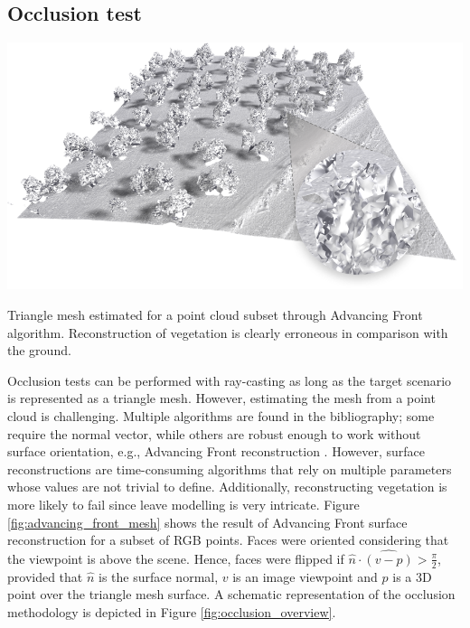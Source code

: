 \newpage
\subsection{Occlusion test}

\begin{marginfigure}[.0cm]
	\centering
	\includegraphics{figs/thermal_projection/triangle_mesh_reconstruction_zoom.png}
	\caption{Triangle mesh estimated for a point cloud subset through Advancing Front algorithm. Reconstruction of vegetation is clearly erroneous in comparison with the ground.}
	\label{fig:advancing_front_mesh}
\end{marginfigure}
Occlusion tests can be performed with ray-casting as long as the target scenario is represented as a triangle mesh. However, estimating the mesh from a point cloud is challenging. Multiple algorithms are found in the bibliography; some require the normal vector, while others are robust enough to work without surface orientation, e.g., Advancing Front reconstruction \cite{cohen-steiner_greedy_2004}. However, surface reconstructions are time-consuming algorithms that rely on multiple parameters whose values are not trivial to define. Additionally, reconstructing vegetation is more likely to fail since leave modelling is very intricate. Figure \ref{fig:advancing_front_mesh} shows the result of Advancing Front surface reconstruction for a subset of RGB points. Faces were oriented considering that the viewpoint is above the scene. Hence, faces were flipped if $\hat{n} \cdot \widehat{(v - p)} > \frac{\pi}{2}$, provided that $\hat{n}$ is the surface normal, $v$ is an image viewpoint and $p$ is a 3D point over the triangle mesh surface. A schematic representation of the occlusion methodology is depicted in Figure \ref{fig:occlusion_overview}.

